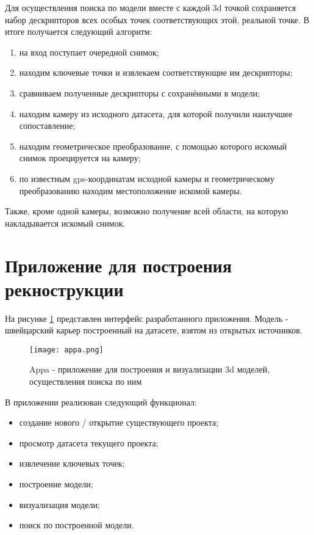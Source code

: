 Для осуществления поиска по модели вместе с каждой 3d точкой сохраняется набор дескрипторов всех особых точек соответствующих этой, реальной точке. В итоге получается следующий алгоритм:

\begin{enumerate}
    \item на вход поступает очередной снимок;
    \item находим ключевые точки и извлекаем соответствующие им дескрипторы;
    \item сравниваем полученные дескрипторы с сохранёнными в модели;
    \item находим камеру из исходного датасета, для которой получили наилучшее сопоставление;
    \item находим геометрическое преобразование, с помощью которого искомый снимок проецируется на  камеру;
    \item по известным gps-координатам исходной камеры и геометрическому преобразованию находим местоположение искомой камеры.
\end{enumerate}

Также, кроме одной камеры, возможно получение всей области, на которую накладывается искомый снимок.

\section{Приложение для построения рекнострукции}

На рисунке \ref{fig:appa} представлен интерфейс разработанного приложения. Модель - швейцарский карьер построенный на датасете, взятом из открытых источников.

\begin{figure}[h]
    \centering
    \texttt{[image: appa.png]}
    \caption{Appa - приложение для построения и визуализации 3d моделей, осуществления поиска по ним}
    \label{fig:appa}
\end{figure}

В приложении реализован следующий функционал:

\begin{itemize}
    \item создание нового / открытие существующего проекта;
    \item просмотр датасета текущего проекта;
    \item извлечение ключевых точек;
    \item построение модели;
    \item визуализация модели;
    \item поиск по построенной модели.
\end{itemize}

